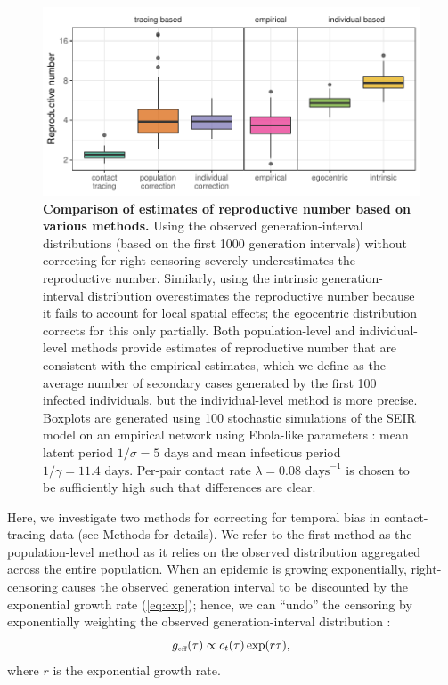 \documentclass[12pt]{article}
\newcommand{\eref}[1]{(\ref{eq:#1})}
\newcommand{\tsub}[2]{#1_{{\textrm{\tiny #2}}}}
\begin{document}
\begin{figure}[!pbth]
\includegraphics[width=\textwidth]{../fig/cmp_reproductive.pdf}
\caption{\textbf{Comparison of estimates of reproductive number based on various methods.}
Using the observed generation-interval distributions (based on the first 1000 generation intervals) without correcting for right-censoring severely underestimates the reproductive number.
Similarly, using the intrinsic generation-interval distribution overestimates the reproductive number because it fails to account for local spatial effects; the egocentric distribution corrects for this only partially.
Both population-level and individual-level methods provide estimates of reproductive number that are consistent with the empirical estimates, which we define as the average number of secondary cases generated by the first 100 infected individuals, but the individual-level method is more precise.
Boxplots are generated using 100 stochastic simulations of the SEIR model on an empirical network using Ebola-like parameters \citep{who2014ebola}: mean latent period $1/\sigma = 5 \textrm{ days}$ and mean infectious period $1/\gamma = 11.4 \textrm{ days}$. 
Per-pair contact rate $\lambda = 0.08 \textrm{ days}^{-1}$ is chosen to be sufficiently high such that differences are clear.
}
\label{fig:cmp}
\end{figure}

Here, we investigate two methods for correcting for temporal bias in contact-tracing data (see Methods for details).
We refer to the first method as the population-level method as it relies on the observed distribution aggregated across the entire population.
When an epidemic is growing exponentially, right-censoring causes the observed generation interval to be discounted by the exponential growth rate \eref{exp};
hence, we can ``undo'' the censoring by exponentially weighting the observed generation-interval distribution \citep{tomba2010some, nishiura2010time, britton2019estimation}:
\begin{equation}
\tsub{g}{eff}(\tau) \propto c_t(\tau) \exp(r\tau),
\label{eq:geff}
\end{equation}
where $r$ is the exponential growth rate.
\end{document}
